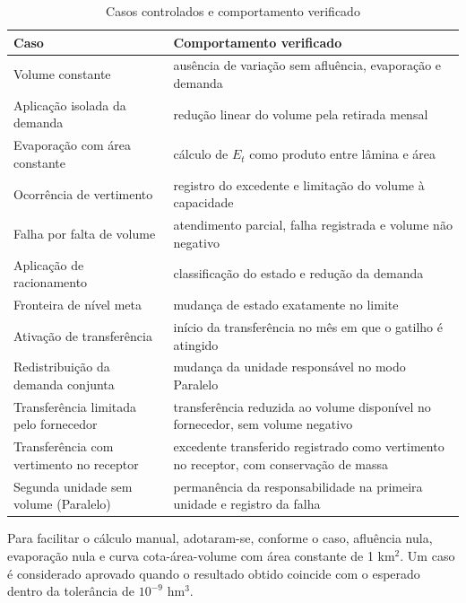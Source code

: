 \begin{table}[!htbp]
    \captionsetup{width=15cm}
    \caption{Casos controlados e comportamento verificado}
    \label{tab:casos-controlados-config}
    \centering
    \footnotesize
    \begin{tabular}{p{4.4cm}p{9.6cm}}
        \toprule
        Caso & Comportamento verificado \\
        \midrule
        Volume constante & ausência de variação sem afluência, evaporação e demanda \\
        Aplicação isolada da demanda & redução linear do volume pela retirada mensal \\
        Evaporação com área constante & cálculo de $E_t$ como produto entre lâmina e área \\
        Ocorrência de vertimento & registro do excedente e limitação do volume à capacidade \\
        Falha por falta de volume & atendimento parcial, falha registrada e volume não negativo \\
        Aplicação de racionamento & classificação do estado e redução da demanda \\
        Fronteira de nível meta & mudança de estado exatamente no limite \\
        Ativação de transferência & início da transferência no mês em que o gatilho é atingido \\
        Redistribuição da demanda conjunta & mudança da unidade responsável no modo Paralelo \\
        Transferência limitada pelo fornecedor & transferência reduzida ao volume disponível no fornecedor, sem volume negativo \\
        Transferência com vertimento no receptor & excedente transferido registrado como vertimento no receptor, com conservação de massa \\
        Segunda unidade sem volume (Paralelo) & permanência da responsabilidade na primeira unidade e registro da falha \\
        \bottomrule
    \end{tabular}
\end{table}

Para facilitar o cálculo manual, adotaram-se, conforme o caso, afluência nula, evaporação nula e curva cota-área-volume com área constante de 1 km$^2$. Um caso é considerado aprovado quando o resultado obtido coincide com o esperado dentro da tolerância de $10^{-9}$ hm$^3$.

